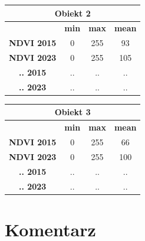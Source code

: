 \documentclass[a4paper,12pt]{article}  %
\begin{document}
\begin{table}[h!]
    \centering
    \begin{tabular}{|c|c|c|c|}
    \hline
    \multicolumn{4}{|c|}{\textbf{Obiekt 2}} \\ \hline
    \textbf{} & \textbf{min} & \textbf{max} & \textbf{mean} \\ \hline
    \textbf{NDVI 2015} & 0 & 255 & 93\\ \hline
    \textbf{NDVI 2023} & 0 & 255 & 105\\ \hline
    \textbf{.. 2015} & .. & .. & ..\\ \hline
    \textbf{.. 2023} & .. & .. & ..\\ \hline
    \end{tabular}
\end{table}

\begin{table}[h!]
    \centering
    \begin{tabular}{|c|c|c|c|}
    \hline
    \multicolumn{4}{|c|}{\textbf{Obiekt 3}} \\ \hline
    \textbf{} & \textbf{min} & \textbf{max} & \textbf{mean} \\ \hline
    \textbf{NDVI 2015} & 0 & 255 & 66\\ \hline
    \textbf{NDVI 2023} & 0 & 255 & 100\\ \hline
    \textbf{.. 2015} & .. & .. & ..\\ \hline
    \textbf{.. 2023} & .. & .. & ..\\ \hline
    \end{tabular}
\end{table}

\section{Komentarz}
\end{document}
